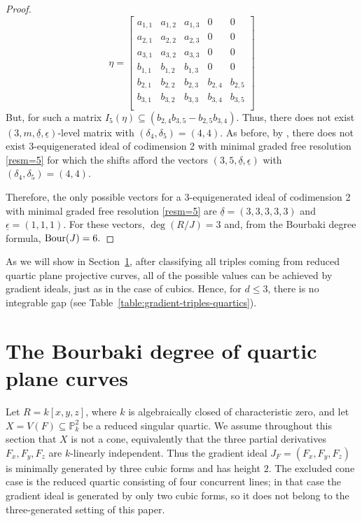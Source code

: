 \documentclass[11pt]{amsart} %
\theoremstyle{definition}
\def\NZQ{\mathbb}               %
\def\PP{{\NZQ P}}
\begin{document}
\begin{proof}
	$$\eta=\left[\begin{matrix}
	a_{1,1}&a_{1,2}&a_{1,3}&0&0\\
	a_{2,1}&a_{2,2}&a_{2,3}&0&0\\
	a_{3,1}&a_{3,2}&a_{3,3}&0&0\\
	b_{1,1}&b_{1,2}&b_{1,3}&0&0\\
	b_{2,1}&b_{2,2}&b_{2,3}&b_{2,4}&b_{2,5}\\
	b_{3,1}&b_{3,2}&b_{3,3}&b_{3,4}&b_{3,5}\\
\end{matrix}\right]$$
But, for such a matrix $I_5(\eta)\subseteq(b_{2,4}b_{3,5}-b_{2,5}b_{3,4})$. Thus, there does not exist  $(3,m,\underline{\delta},\underline{\epsilon})$-level matrix with $(\delta_4,\delta_5)=(4,4)$.  As before, by \cite[Theorem 1.3]{BFRS}, there does not exist $3$-equigenerated ideal of codimension 2  with minimal graded free resolution \eqref{resm=5}  for which the shifts  afford the
vectors $(3,5,\underline{\delta},\underline{\epsilon})$ with  $(\delta_4,\delta_5)=(4,4)$. 

Therefore, the only possible vectors for a $3$-equigenerated ideal of codimension 2  with minimal graded free resolution \eqref{resm=5} are $\underline{\delta}=(3,3,3,3,3)$ and $\underline{\epsilon}=(1,1,1)$. For these vectors, $\deg(R/J)=3$ and, from the Bourbaki degree formula, ${\rm Bour}(J)=6.$
	\end{proof}

As we will show in
Section~\ref{sec:quartic-curves}, after classifying all triples coming from reduced quartic plane projective curves, all of the possible values can be achieved by gradient ideals, just as in the case of cubics. Hence, for $d \leq 3$, there is no integrable gap (see Table~\ref{table:gradient-triples-quartics}).


\section{The Bourbaki degree of quartic plane curves}\label{sec:quartic-curves}

Let $R=k[x,y,z]$, where $k$ is algebraically closed of characteristic zero, and let $X=V(F)\subseteq \PP^2_k$ be a reduced singular quartic. We assume throughout this section that $X$ is not a cone, equivalently that the three partial derivatives $F_x,F_y,F_z$ are $k$-linearly independent. Thus the gradient ideal $J_F=(F_x,F_y,F_z)$ is minimally generated by three cubic forms and has height $2$. The excluded cone case is the reduced quartic consisting of four concurrent lines; in that case the gradient ideal is generated by only two cubic forms, so it does not belong to the three-generated setting of this paper.
\end{document}
